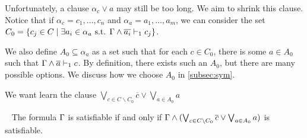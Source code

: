 Unfortunately, a clause $\alpha_c \lor a$ may still be too long. We aim to
shrink this clause. Notice that if $\alpha_c = c_1, \dots, c_n$ and $\alpha_a =
a_1, \dots, a_m$, we can consider the set $C_0 = \{c_j \in C \mid \exists a_i \in
\alpha_a \text{ s.t. } \Gamma \land \overline{a_i} \vdash_1 c_j \}$.







We also define $A_0 \subseteq \alpha_a$ as a set such that for each $c \in C_0$,
there is some $a \in A_0$ such that $\Gamma \land \overline{a} \vdash_1 c$. By definition,
there exists such an $A_0$, but there are many possible options. We discuss how
we choose $A_0$ in \autoref{subsec:sym}.



We want learn the clause $\bigvee_{c \in C \backslash C_0} \overline{c} \lor
\bigvee_{a \in A_0} a$


\begin{theorem}~\label{thm:shrunkgbcequisat}
    The formula $\Gamma$ is satisfiable if and only if $\Gamma \land (\bigvee_{c \in C \backslash C_0} \overline{c} \lor \bigvee_{a \in A_0} a)$ is satisfiable.
\end{theorem}

